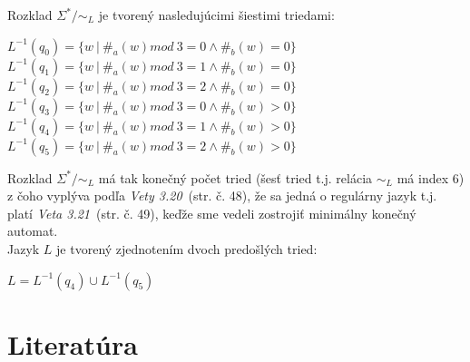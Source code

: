 \documentclass[11pt,a4paper]{article}
\begin{document}
Rozklad $\Sigma^* / \sim_L$ je tvorený nasledujúcimi šiestimi triedami:

\begin{center}
$L^{-1}(q_0) = \{w\ |\ \#_a(w) mod\ 3 = 0 \wedge \#_b(w) = 0\}$\\
$L^{-1}(q_1) = \{w\ |\ \#_a(w) mod\ 3 = 1 \wedge \#_b(w) = 0\}$\\
$L^{-1}(q_2) = \{w\ |\ \#_a(w) mod\ 3 = 2 \wedge \#_b(w) = 0\}$\\
$L^{-1}(q_3) = \{w\ |\ \#_a(w) mod\ 3 = 0 \wedge \#_b(w) > 0\}$\\
$L^{-1}(q_4) = \{w\ |\ \#_a(w) mod\ 3 = 1 \wedge \#_b(w) > 0\}$\\
$L^{-1}(q_5) = \{w\ |\ \#_a(w) mod\ 3 = 2 \wedge \#_b(w) > 0\}$\\
\end{center}

Rozklad $\Sigma^* / \sim_L$ má tak konečný počet tried (šesť tried t.j. relácia $\sim_L$ má index 6) z čoho vyplýva podľa \textit{Vety 3.20}~\cite{TIN}(str. č. 48), že sa jedná o regulárny jazyk t.j. platí \textit{Veta 3.21}~\cite{TIN}(str. č. 49), keďže sme vedeli zostrojiť minimálny konečný automat.\\

Jazyk $L$ je tvorený zjednotením dvoch predošlých tried:

\begin{center}
$L = L^{-1}(q_4) \cup L^{-1}(q_5)$\\
\end{center}

\newpage
\section{Literatúra}

\begin{flushleft}
    
\end{flushleft}
\end{document}
